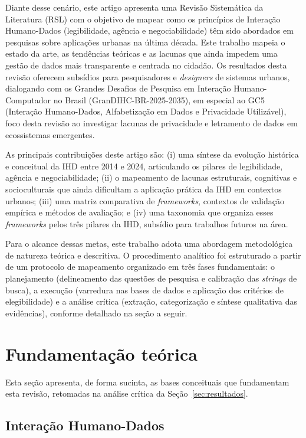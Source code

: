 \documentclass[12pt]{article}
\begin{document}
    Diante desse cenário, este artigo apresenta uma Revisão Sistemática da Literatura (RSL) com o objetivo de mapear como os princípios de Interação Humano-Dados (legibilidade, agência e negociabilidade) \cite{mortier2015humandatainteractionhumanface} têm sido abordados em pesquisas sobre aplicações urbanas na última década. Este trabalho mapeia o estado da arte, as tendências teóricas e as lacunas que ainda impedem uma gestão de dados mais transparente e centrada no cidadão. Os resultados desta revisão oferecem subsídios para pesquisadores e \textit{designers} de sistemas urbanos, dialogando com os Grandes Desafios de Pesquisa em Interação Humano-Computador no Brasil (GranDIHC-BR-2025-2035), em especial ao GC5 (Interação Humano-Dados, Alfabetização em Dados e Privacidade Utilizável), foco desta revisão ao investigar lacunas de privacidade e letramento de dados em ecossistemas emergentes.

    As principais contribuições deste artigo são: (i) uma síntese da evolução histórica e conceitual da IHD entre 2014 e 2024, articulando os pilares de legibilidade, agência e negociabilidade; (ii) o mapeamento de lacunas estruturais, cognitivas e socioculturais que ainda dificultam a aplicação prática da IHD em contextos urbanos; (iii) uma matriz comparativa de \textit{frameworks}, contextos de validação empírica e métodos de avaliação; e (iv) uma taxonomia que organiza esses \textit{frameworks} pelos três pilares da IHD, subsídio para trabalhos futuros na área.

    Para o alcance dessas metas, este trabalho adota uma abordagem metodológica de natureza teórica e descritiva. O procedimento analítico foi estruturado a partir de um protocolo de mapeamento organizado em três fases fundamentais: o planejamento (delineamento das questões de pesquisa e calibração das \textit{strings} de busca), a execução (varredura nas bases de dados e aplicação dos critérios de elegibilidade) e a análise crítica (extração, categorização e síntese qualitativa das evidências), conforme detalhado na seção a seguir.
    

\section{Fundamentação teórica}
\label{sec:referencial}

Esta seção apresenta, de forma sucinta, as bases conceituais que fundamentam esta revisão, retomadas na análise crítica da Seção~\ref{sec:resultados}.

\subsection{Interação Humano-Dados}
\end{document}
